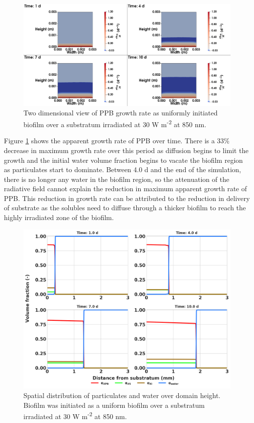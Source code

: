 \begin{figure}[H]
    \centering
     \hspace*{-1cm}\includegraphics[width=1.1\textwidth,height=0.4\textheight]{Chap4/methods/data/figures/case1_growth_frac.png}
    \caption{Two dimensional view of PPB growth rate as uniformly initiated biofilm over a substratum irradiated at 30 W m\textsuperscript{-2} at 850 nm.} 
    \label{fig:case1_growth_frac}
\end{figure}

Figure \ref{fig:case1_growth_frac} shows the apparent growth rate of PPB over time. There is a 33\% decrease in maximum growth rate over this period as diffusion begins to limit the growth and the initial water volume fraction begins to vacate the biofilm region as particulates start to dominate. Between 4.0 d and the end of the simulation, there is no longer any water in the biofilm region, so the attenuation of the radiative field cannot explain the reduction in maximum apparent growth rate of PPB. This reduction in growth rate can be attributed to the reduction in delivery of substrate as the solubles need to diffuse through a thicker biofilm to reach the highly irradiated zone of the biofilm.

\begin{figure}[H]
    \centering
    \includegraphics[width=\textwidth,height=0.45\textheight]{Chap4/methods/output/case1.png}
    \caption{Spatial distribution of particulates and water over domain height. Biofilm was initiated as a uniform biofilm over a substratum irradiated at 30 W m\textsuperscript{-2} at 850 nm.} 
    \label{fig:case1_dist_frac}
\end{figure}
 

